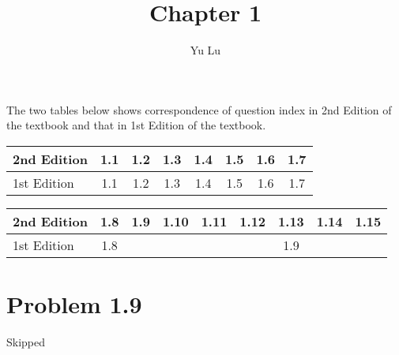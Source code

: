 \documentclass{article}
\title{Chapter 1}
\author{Yu Lu}
\begin{document}
\newcommand{\pz}{\ket{\vb{+z}}}
\newcommand{\nz}{\ket{\vb{-z}}}
\newcommand{\px}{\ket{\vb{+x}}}
\newcommand{\nx}{\ket{\vb{-x}}}
\newcommand{\py}{\ket{\vb{+z}}}
\newcommand{\ny}{\ket{\vb{-y}}}

\newcommand{\pxexpr}{ \frac{1}{\sqrt{2}} \pz + \frac{1}{\sqrt{2}} \nz}
\newcommand{\nxexpr}{ \frac{1}{\sqrt{2}} \pz - \frac{1}{\sqrt{2}} \nz}
\newcommand{\pyexpr}{ \frac{1}{\sqrt{2}} \pz + \frac{i}{\sqrt{2}} \nz}
\newcommand{\nyexpr}{ \frac{1}{\sqrt{2}} \pz - \frac{i}{\sqrt{2}} \nz}
\maketitle
The two tables below shows correspondence of question index in 2nd Edition of the textbook and that in 1st Edition of the textbook.
\begin{table}[h!]
    \begin{center}
        \begin{tabular}{l|c|c|c|c|c|c|c}
            \hline
            2nd Edition
            &1.1
            &1.2
            &1.3
            &1.4
            &1.5
            &1.6
            &1.7
            \\ \hline
            1st Edition
            &1.1
            &1.2
            &1.3
            &1.4
            &1.5
            &1.6
            &1.7
            \\ \hline
        \end{tabular}
    \end{center}
\end{table}
\begin{table}[h!]
    \begin{center}
        \begin{tabular}{l|c|c|c|c|c|c|c|c}
            \hline
            2nd Edition
            &1.8
            &1.9
            &1.10
            &1.11
            &1.12
            &1.13
            &1.14
            &1.15
            \\ \hline
            1st Edition
            &1.8
            &
            &
            &
            &
            &1.9
            &
            &
            \\ \hline
        \end{tabular}
    \end{center}
\end{table}
\section*{Problem 1.9}
Skipped
\end{document}

